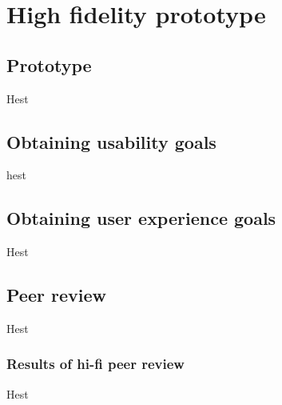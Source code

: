 \chapter{High fidelity prototype}


\section{Prototype}
Hest

\section{Obtaining usability goals}
hest

\section{Obtaining user experience goals}
Hest

\section{Peer review}
Hest

\subsection{Results of hi-fi peer review}
Hest